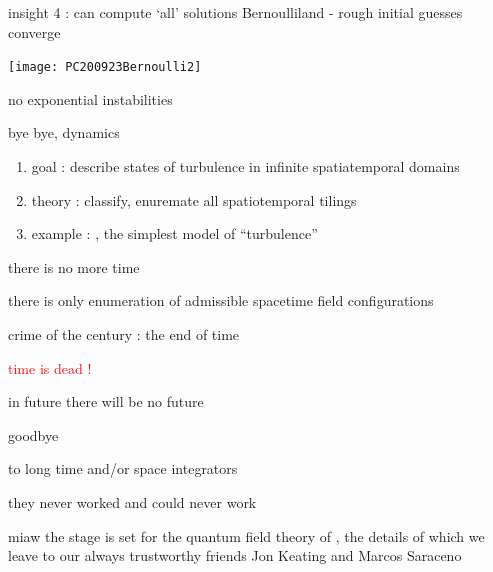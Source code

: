 \begin{frame}{insight 4 : can compute `all' solutions}
Bernoulliland - rough initial guesses converge
\begin{center}
\hfill\texttt{[image: PC200923Bernoulli2]}
\end{center}
no exponential instabilities
\end{frame}

\begin{frame}{bye bye, dynamics}
\begin{enumerate}
              \item
goal : describe states of turbulence in infinite spatiatemporal domains
              \item
theory : classify, enuremate all spatiotemporal tilings
              \item
example : \catlatt, the simplest model of ``turbulence''
\end{enumerate}

\vfill

there is no more time

\medskip

there is only enumeration of admissible spacetime field configurations
\end{frame}

\begin{frame}{crime of the century : the end of time}
\begin{center}
\textcolor{red}{{\huge time is dead !}}
\end{center}
\end{frame}

\begin{frame}{in future there will be no future}
\begin{center}
{\huge goodbye}
\end{center}

\vfill

to long time and/or space integrators

\medskip

\hfill they never worked and could never work
\end{frame}

\begin{frame}{miaw}
\vfill
the stage is set for the quantum field theory of \catlatt, the details of
which we leave to our always trustworthy
friends Jon Keating and Marcos Saraceno
\end{frame}



